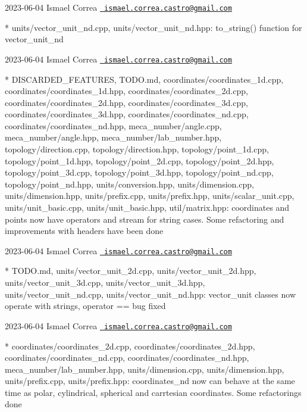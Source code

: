  2023-\/06-\/04 Ismael Correa \href{mailto:ismael.correa.castro@gmail.com}{\texttt{ ismael.\+correa.\+castro@gmail.\+com}} \begin{DoxyVerb}* units/vector_unit_nd.cpp, units/vector_unit_nd.hpp: to_string()
function for vector_unit_nd
\end{DoxyVerb}
 2023-\/06-\/04 Ismael Correa \href{mailto:ismael.correa.castro@gmail.com}{\texttt{ ismael.\+correa.\+castro@gmail.\+com}} \begin{DoxyVerb}* DISCARDED_FEATURES, TODO.md, coordinates/coordinates_1d.cpp,
coordinates/coordinates_1d.hpp, coordinates/coordinates_2d.cpp,
coordinates/coordinates_2d.hpp, coordinates/coordinates_3d.cpp,
coordinates/coordinates_3d.hpp, coordinates/coordinates_nd.cpp,
coordinates/coordinates_nd.hpp, meca_number/angle.cpp,
meca_number/angle.hpp, meca_number/lab_number.hpp,
topology/direction.cpp, topology/direction.hpp,
topology/point_1d.cpp, topology/point_1d.hpp,
topology/point_2d.cpp, topology/point_2d.hpp,
topology/point_3d.cpp, topology/point_3d.hpp,
topology/point_nd.cpp, topology/point_nd.hpp, units/conversion.hpp,
units/dimension.cpp, units/dimension.hpp, units/prefix.cpp,
units/prefix.hpp, units/scalar_unit.cpp, units/unit_basic.cpp,
units/unit_basic.hpp, util/matrix.hpp: coordinates and points now
have operators and stream for string cases. Some refactoring and
improvements with headers have been done
\end{DoxyVerb}
 2023-\/06-\/04 Ismael Correa \href{mailto:ismael.correa.castro@gmail.com}{\texttt{ ismael.\+correa.\+castro@gmail.\+com}} \begin{DoxyVerb}* TODO.md, units/vector_unit_2d.cpp, units/vector_unit_2d.hpp,
units/vector_unit_3d.cpp, units/vector_unit_3d.hpp,
units/vector_unit_nd.cpp, units/vector_unit_nd.hpp: vector_unit
classes now operate with strings, operator == bug fixed
\end{DoxyVerb}
 2023-\/06-\/04 Ismael Correa \href{mailto:ismael.correa.castro@gmail.com}{\texttt{ ismael.\+correa.\+castro@gmail.\+com}} \begin{DoxyVerb}* coordinates/coordinates_2d.cpp, coordinates/coordinates_2d.hpp,
coordinates/coordinates_nd.cpp, coordinates/coordinates_nd.hpp,
meca_number/lab_number.hpp, units/dimension.cpp,
units/dimension.hpp, units/prefix.cpp, units/prefix.hpp: 
coordinates_nd now can behave at the same time as polar,
cylindrical, spherical and carrtesian coordinates. Some refactorings
done
\end{DoxyVerb}
